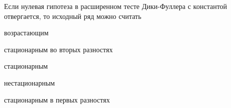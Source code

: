 
\begin{question}
Если нулевая гипотеза в расширенном тесте Дики-Фуллера с константой
отвергается, то исходный ряд можно считать
\begin{answerlist}
  \item возрастающим
  \item стационарным во вторых разностях
  \item стационарным
  \item нестационарным
  \item стационарным в первых разностях
\end{answerlist}
\end{question}


